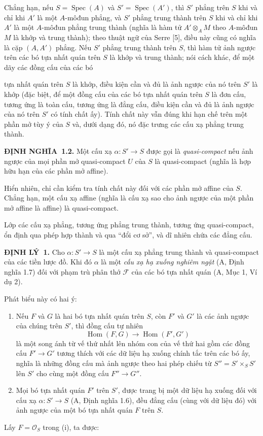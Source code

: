 \documentclass[11pt,twoside,openany]{book}
\numberwithin{equation}{section}
\newcommand{\src}[1]{%
  \phantomsection\hypertarget{src:\fgasourceid:#1}{}%
  \marginpar{\raggedleft\footnotesize\sffamily #1}%
}
\newcommand{\fgasourceid}{unset}
\newcommand{\result}[2]{\par\medskip\noindent\textbf{#1\if\relax\detokenize{#2}\relax\else\ #2\fi.}\quad}
\begin{document}
Chẳng hạn, nếu $S=\operatorname{Spec}(A)$ và
$S'=\operatorname{Spec}(A')$, thì $S'$ phẳng trên $S$ khi và chỉ khi $A'$ là
một $A$-môđun phẳng, và $S'$ phẳng trung thành trên $S$ khi và chỉ khi $A'$ là
một $A$-môđun phẳng trung thành (nghĩa là hàm tử $A'\otimes_A M$ theo
$A$-môđun $M$ là khớp và trung thành); theo thuật ngữ của Serre [5], điều này
cũng có nghĩa là cặp $(A,A')$ phẳng. Nếu $S'$ phẳng trung thành trên $S$, thì
hàm tử ảnh ngược trên các bó tựa nhất quán trên $S$ là khớp và trung thành;
nói cách khác, để một dãy các đồng cấu của các bó

\src{315}
tựa nhất quán trên $S$ là khớp, điều kiện cần và đủ là ảnh ngược của nó trên
$S'$ là khớp (đặc biệt, để một đồng cấu của các bó tựa nhất quán trên $S$ là
đơn cấu, tương ứng là toàn cấu, tương ứng là đẳng cấu, điều kiện cần và đủ là
ảnh ngược của nó trên $S'$ có tính chất ấy). Tính chất này vẫn đúng khi hạn chế
trên một phần mở tùy ý của $S$ và, dưới dạng đó, nó đặc trưng các cấu xạ phẳng
trung thành.

\result{ĐỊNH NGHĨA}{1.2} Một cấu xạ $\alpha:S'\longrightarrow S$ được gọi là
\emph{quasi-compact} nếu ảnh ngược của mọi phần mở quasi-compact $U$ của $S$
là quasi-compact (nghĩa là hợp hữu hạn của các phần mở affine).

Hiển nhiên, chỉ cần kiểm tra tính chất này đối với các phần mở affine của $S$.
Chẳng hạn, một cấu xạ affine (nghĩa là cấu xạ sao cho ảnh ngược của một phần mở
affine là affine) là quasi-compact.

Lớp các cấu xạ phẳng, tương ứng phẳng trung thành, tương ứng quasi-compact, ổn
định qua phép hợp thành và qua ``đổi cơ sở'', và dĩ nhiên chứa các đẳng cấu.

\result{ĐỊNH LÝ}{1} Cho $\alpha:S'\longrightarrow S$ là một cấu xạ phẳng trung
thành và quasi-compact của các tiền lược đồ. Khi đó $\alpha$ là một \emph{cấu
xạ hạ xuống nghiêm ngặt} (A, Định nghĩa 1.7) đối với phạm trù phân thớ
$\mathcal F$ của các bó tựa nhất quán (A, Mục 1, Ví dụ 2).

Phát biểu này có hai ý:
\begin{enumerate}
\item[(i)] Nếu $F$ và $G$ là hai bó tựa nhất quán trên $S$, còn $F'$ và $G'$
là các ảnh ngược của chúng trên $S'$, thì đồng cấu tự nhiên
\[
  \operatorname{Hom}(F,G)\longrightarrow\operatorname{Hom}(F',G')
\]
là một song ánh từ vế thứ nhất lên nhóm con của vế thứ hai gồm các đồng cấu
$F'\longrightarrow G'$ tương thích với các dữ liệu hạ xuống chính tắc trên các
bó ấy, nghĩa là những đồng cấu mà ảnh ngược theo hai phép chiếu từ
$S''=S'\times_SS'$ lên $S'$ cho cùng một đồng cấu
$F''\longrightarrow G''$.
\item[(ii)] Mọi bó tựa nhất quán $F'$ trên $S'$, được trang bị một dữ liệu hạ
xuống đối với cấu xạ $\alpha:S'\longrightarrow S$ (A, Định nghĩa 1.6), đều
đẳng cấu (cùng với dữ liệu đó) với ảnh ngược của một bó tựa nhất quán $F$ trên
$S$.
\end{enumerate}
Lấy $F=\mathcal O_S$ trong (i), ta được:
\end{document}
